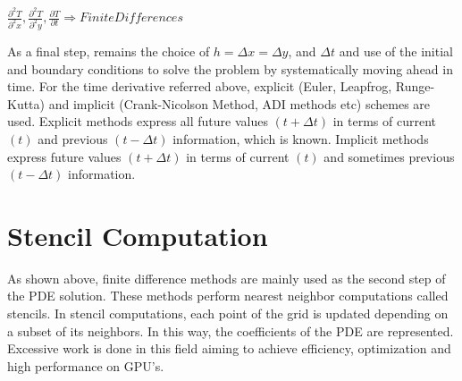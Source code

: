 $\frac{\partial^2 T}{\partial^2 x} , \frac{\partial^2 T}{\partial^2 y} , \frac{\partial T}{\partial t}  \Longrightarrow Finite   Differences $

As a final step, remains the choice of $h = Δx = Δy$, and $Δt$ and use of the initial and boundary conditions to solve the problem by systematically moving ahead in time. For the time derivative referred above, explicit (Euler, Leapfrog, Runge-Kutta) and implicit (Crank-Nicolson Method, ADI methods etc) schemes are used. Explicit methods express all future values $(t + Δt)$ in terms of current $(t)$ and previous $(t - Δt)$ information, which is known. Implicit methods express future values $(t + Δt)$ in terms of current $(t)$ and sometimes previous $(t - Δt)$ information.

\section{Stencil Computation}
As shown above, finite difference methods are mainly used as the second step of the PDE solution. These methods perform nearest neighbor computations called stencils. In stencil computations, each point of the grid is updated depending on a subset of its neighbors. In this way, the coefficients of the PDE are represented. Excessive work is done in this field aiming to achieve efficiency, optimization and high performance on GPU's. 
